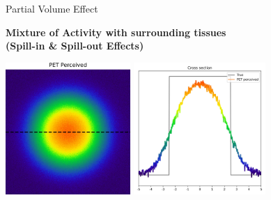 \documentclass[aspectratio=169]{beamer}
\begin{document}
\begin{frame}{Partial Volume Effect}
	\begin{center}
		\Large\textbf{Mixture of Activity with surrounding tissues\\(Spill-in \& Spill-out Effects)}

		\vfill
		\includegraphics[height=5cm]{pve_perceived.jpg}
		\includegraphics[height=5cm]{pve_crosssection.jpg}
	\end{center}
\end{frame}
\end{document}
